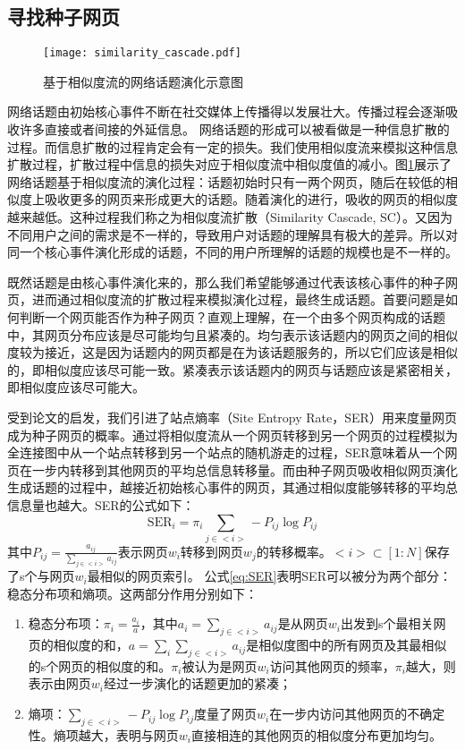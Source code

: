 \subsection{寻找种子网页}
\begin{figure}[!htbp]
    \centering
    \texttt{[image: similarity\_cascade.pdf]}
    \caption{基于相似度流的网络话题演化示意图}
    \label{fig:similarity_cascade}
\end{figure}
网络话题由初始核心事件不断在社交媒体上传播得以发展壮大。传播过程会逐渐吸收许多直接或者间接的外延信息。
网络话题的形成可以被看做是一种信息扩散的过程。而信息扩散的过程肯定会有一定的损失。我们使用相似度流来模拟这种信息扩散过程，扩散过程中信息的损失对应于相似度流中相似度值的减小。图\ref{fig:similarity_cascade}展示了网络话题基于相似度流的演化过程：话题初始时只有一两个网页，随后在较低的相似度上吸收更多的网页来形成更大的话题。随着演化的进行，吸收的网页的相似度越来越低。这种过程我们称之为相似度流扩散（Similarity Cascade, SC）。又因为不同用户之间的需求是不一样的，导致用户对话题的理解具有极大的差异。所以对同一个核心事件演化形成的话题，不同的用户所理解的话题的规模也是不一样的。

既然话题是由核心事件演化来的，那么我们希望能够通过代表该核心事件的种子网页，进而通过相似度流的扩散过程来模拟演化过程，最终生成话题。首要问题是如何判断一个网页能否作为种子网页？直观上理解，在一个由多个网页构成的话题中，其网页分布应该是尽可能均匀且紧凑的\citep{liu2014entropy}。均匀表示该话题内的网页之间的相似度较为接近，这是因为话题内的网页都是在为该话题服务的，所以它们应该是相似的，即相似度应该尽可能一致。紧凑表示该话题内的网页与话题应该是紧密相关，即相似度应该尽可能大。

受到论文\citep{wang2010measuring}的启发，我们引进了站点熵率（Site Entropy Rate，SER）用来度量网页成为种子网页的概率。通过将相似度流从一个网页转移到另一个网页的过程模拟为全连接图中从一个站点转移到另一个站点的随机游走的过程，SER意味着从一个网页在一步内转移到其他网页的平均总信息转移量。而由种子网页吸收相似网页演化生成话题的过程中，越接近初始核心事件的网页，其通过相似度能够转移的平均总信息量也越大。SER的公式如下：
\begin{equation} \label{eq:SER}
\text{SER}_i = \pi_i\sum_{j\in<i>}-P_{ij}\log P_{ij}
\end{equation}
其中$P_{ij}=\frac{a_{ij}}{\sum_{j\in <i>}a_{ij}}$表示网页$w_i$转移到网页$w_j$的转移概率。$<i>\subset[1:N]$保存了s个与网页$w_i$最相似的网页索引。
公式\ref{eq:SER}表明SER可以被分为两个部分：稳态分布项和熵项。这两部分作用分别如下：
\begin{enumerate}
  \item[1)] 稳态分布项：$\pi_i = \frac{a_i}{a}$，其中$a_i=\sum_{j\in<i>}a_{ij}$是从网页$w_i$出发到s个最相关网页的相似度的和，$a = \sum_{i}\sum_{j\in<i>}a_{ij}$是相似度图中的所有网页及其最相似的s个网页的相似度的和。$\pi_i$被认为是网页$w_i$访问其他网页的频率，$\pi_i$越大，则表示由网页$w_i$经过一步演化的话题更加的紧凑；
  \item[2)] 熵项：$\sum_{j\in<i>}-P_{ij}\log P_{ij}$度量了网页$w_i$在一步内访问其他网页的不确定性。熵项越大，表明与网页$w_i$直接相连的其他网页的相似度分布更加均匀。
\end{enumerate}

